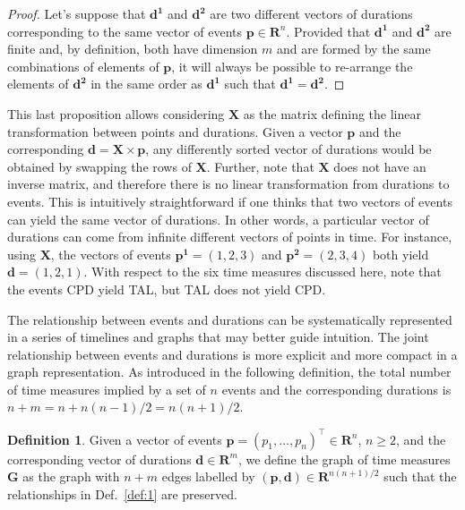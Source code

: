 \documentclass[12pt,oneside,a4paper]{article} %
\theoremstyle{definition}
\newtheorem{definition}{Definition}[section]
\begin{document}
\begin{proof}
 Let's suppose that $\boldsymbol{d^1}$ and $\boldsymbol{d^2}$ are two different
 vectors of durations corresponding to the same vector of events
 $\boldsymbol{p}\in\mathbf{R}^n$. Provided that $\boldsymbol{d^1}$ and
 $\boldsymbol{d^2}$ are finite and, by definition, both have dimension $m$ and are formed by the same combinations of elements of $\boldsymbol{p}$, it will always be possible to re-arrange the elements of $\boldsymbol{d^2}$ in the same order as $\boldsymbol{d^1}$ such that $\boldsymbol{d^1}=\boldsymbol{d^2}$.
\end{proof}

This last proposition allows considering $\boldsymbol{X}$ as the matrix defining
the linear transformation between points and durations. Given a vector
$\boldsymbol{p}$ and the corresponding
$\boldsymbol{d}=\boldsymbol{X}\times\boldsymbol{p}$, any differently sorted
vector of durations would be obtained by swapping the rows of $\boldsymbol{X}$.
Further, note that $\boldsymbol{X}$ does not have an inverse matrix, and
therefore there is no linear transformation from durations to events. This is
intuitively straightforward if one thinks that two vectors of events can yield
the same vector of durations. In other words, a particular vector of durations
can come from infinite different vectors of points in time. For instance, using
$\boldsymbol{X}$, the vectors of events $\boldsymbol{p^1}=(1,2,3)$ and
$\boldsymbol{p^2}=(2,3,4)$ both yield $\boldsymbol{d}=(1,2,1)$. With respect to
the six time measures discussed here, note that the events CPD yield TAL, but TAL does not yield CPD.

The relationship between events and durations can be
systematically represented in a series of timelines and graphs that may better
guide intuition.
The joint relationship between events and durations is more explicit and more
compact in a graph representation. As introduced in the following definition, the total number of time measures implied by a set of $n$ events and the corresponding durations is 
$n+m=n+n(n-1)/2=n(n+1)/2$. 

\begin{definition}
 Given a vector of events $\boldsymbol{p}=(p_1,\ldots,p_n)^\top\in\mathbf{R}^n$,
 $n\geq2$, and the corresponding vector of durations
 $\boldsymbol{d}\in\mathbf{R}^m$, we define the graph of time measures
 $\boldsymbol{G}$ as the graph with $n+m$ edges
 labelled by $(\boldsymbol{p},\boldsymbol{d})\in\mathbf{R}^{n(n+1)/2}$ such that
 the relationships in Def.~\ref{def:1} are preserved.
 \label{def:2}
\end{definition}
\end{document}
